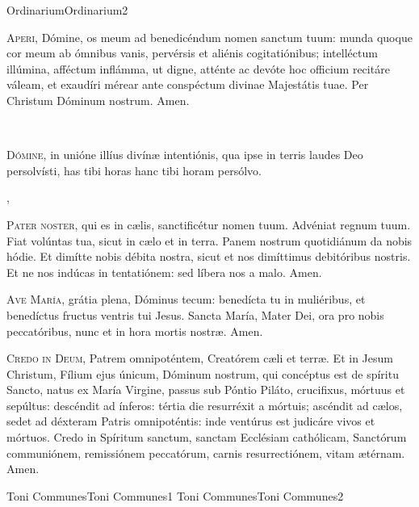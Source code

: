 \documentclass[invitatoriale-romanum.tex]{subfiles}
\begin{document}
	{Ordinarium}{Ordinarium}{2}{}{}{}{}{}{}

\begin{multicols}{2}
\lettrine{A}{peri}, Dómine, os meum ad benedicéndum nomen sanctum tuum:
munda quoque cor meum ab ómnibus vanis, pervérsis et aliénis cogitatiónibus; 
intelléctum illúmina, afféctum inflámma, ut digne, atténte ac devóte
hoc officium recitáre váleam, et exaudíri mérear
ante conspéctum divinae Majestátis tuae. Per Christum Dóminum nostrum. Amen.

~

\lettrine{D}{ómine}, in unióne illíus divínæ intentiónis,
qua ipse in terris laudes Deo persolvísti,
has tibi horas  hanc tibi horam\rubric{)} persólvo.
\end{multicols}

\sep

\begin{multicols}{2}
\lettrine{P}{ater noster}, qui es in cælis, sanctificétur nomen tuum.
Advéniat regnum tuum. Fiat volúntas tua, sicut in cælo et in terra.
Panem nostrum quotidiánum da nobis hódie.
Et dimítte nobis débita nostra, sicut et nos dimíttimus debitóribus nostris.
Et ne nos indúcas in tentatiónem: sed líbera nos a malo. Amen.

\lettrine{A}{ve María}, grátia plena, Dóminus tecum:
benedícta tu in muliéribus, et benedíctus fructus ventris tui Jesus.
Sancta María, Mater Dei, ora pro nobis peccatóribus,
nunc et in hora mortis nostræ. Amen.

\lettrine{C}{redo in Deum}, Patrem omnipoténtem, Creatórem cæli et terræ.
Et in Jesum Christum, Fílium ejus únicum, Dóminum nostrum,
qui concéptus est de spíritu Sancto, natus ex María Virgine,
passus sub Póntio Piláto, crucifixus, mórtuus et sepúltus:
descéndit ad ínferos: tértia die resurréxit a mórtuis;
ascéndit ad cælos, sedet ad déxteram Patris omnipoténtis:
inde ventúrus est judicáre vivos et mórtuos.
Credo in Spíritum sanctum, sanctam Ecclésiam cathólicam,
Sanctórum communiónem, remissiónem peccatórum,
carnis resurrectiónem, vitam ætérnam. Amen.
\end{multicols}

\pagebreak

	{Toni Communes}{Toni Communes}{1}{}{}{}{}{}{}
\vspace{-6mm}
	{Toni Communes}{Toni Communes}{2}{}{}{}{}{}{}
\end{document}
